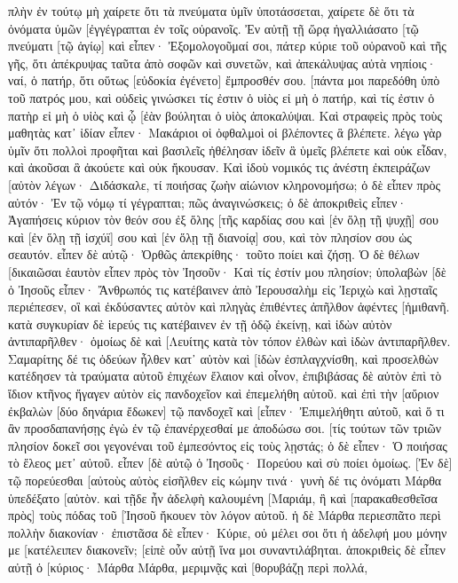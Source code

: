 πλὴν ἐν τούτῳ μὴ χαίρετε ὅτι τὰ πνεύματα ὑμῖν ὑποτάσσεται, χαίρετε δὲ ὅτι τὰ ὀνόματα ὑμῶν [ἐγγέγραπται ἐν τοῖς οὐρανοῖς. 
Ἐν αὐτῇ τῇ ὥρᾳ ἠγαλλιάσατο [τῷ πνεύματι [τῷ ἁγίῳ] καὶ εἶπεν· Ἐξομολογοῦμαί σοι, πάτερ κύριε τοῦ οὐρανοῦ καὶ τῆς γῆς, ὅτι ἀπέκρυψας ταῦτα ἀπὸ σοφῶν καὶ συνετῶν, καὶ ἀπεκάλυψας αὐτὰ νηπίοις· ναί, ὁ πατήρ, ὅτι οὕτως [εὐδοκία ἐγένετο] ἔμπροσθέν σου. 
[πάντα μοι παρεδόθη ὑπὸ τοῦ πατρός μου, καὶ οὐδεὶς γινώσκει τίς ἐστιν ὁ υἱὸς εἰ μὴ ὁ πατήρ, καὶ τίς ἐστιν ὁ πατὴρ εἰ μὴ ὁ υἱὸς καὶ ᾧ [ἐὰν βούληται ὁ υἱὸς ἀποκαλύψαι. 
Καὶ στραφεὶς πρὸς τοὺς μαθητὰς κατ᾽ ἰδίαν εἶπεν· Μακάριοι οἱ ὀφθαλμοὶ οἱ βλέποντες ἃ βλέπετε. 
λέγω γὰρ ὑμῖν ὅτι πολλοὶ προφῆται καὶ βασιλεῖς ἠθέλησαν ἰδεῖν ἃ ὑμεῖς βλέπετε καὶ οὐκ εἶδαν, καὶ ἀκοῦσαι ἃ ἀκούετε καὶ οὐκ ἤκουσαν. 
Καὶ ἰδοὺ νομικός τις ἀνέστη ἐκπειράζων [αὐτὸν λέγων· Διδάσκαλε, τί ποιήσας ζωὴν αἰώνιον κληρονομήσω; 
ὁ δὲ εἶπεν πρὸς αὐτόν· Ἐν τῷ νόμῳ τί γέγραπται; πῶς ἀναγινώσκεις; 
ὁ δὲ ἀποκριθεὶς εἶπεν· Ἀγαπήσεις κύριον τὸν θεόν σου ἐξ ὅλης [τῆς καρδίας σου καὶ [ἐν ὅλῃ τῇ ψυχῇ] σου καὶ [ἐν ὅλῃ τῇ ἰσχύϊ] σου καὶ [ἐν ὅλῃ τῇ διανοίᾳ] σου, καὶ τὸν πλησίον σου ὡς σεαυτόν. 
εἶπεν δὲ αὐτῷ· Ὀρθῶς ἀπεκρίθης· τοῦτο ποίει καὶ ζήσῃ. 
Ὁ δὲ θέλων [δικαιῶσαι ἑαυτὸν εἶπεν πρὸς τὸν Ἰησοῦν· Καὶ τίς ἐστίν μου πλησίον; 
ὑπολαβὼν [δὲ ὁ Ἰησοῦς εἶπεν· Ἄνθρωπός τις κατέβαινεν ἀπὸ Ἰερουσαλὴμ εἰς Ἰεριχὼ καὶ λῃσταῖς περιέπεσεν, οἳ καὶ ἐκδύσαντες αὐτὸν καὶ πληγὰς ἐπιθέντες ἀπῆλθον ἀφέντες [ἡμιθανῆ. 
κατὰ συγκυρίαν δὲ ἱερεύς τις κατέβαινεν ἐν τῇ ὁδῷ ἐκείνῃ, καὶ ἰδὼν αὐτὸν ἀντιπαρῆλθεν· 
ὁμοίως δὲ καὶ [Λευίτης κατὰ τὸν τόπον ἐλθὼν καὶ ἰδὼν ἀντιπαρῆλθεν. 
Σαμαρίτης δέ τις ὁδεύων ἦλθεν κατ᾽ αὐτὸν καὶ [ἰδὼν ἐσπλαγχνίσθη, 
καὶ προσελθὼν κατέδησεν τὰ τραύματα αὐτοῦ ἐπιχέων ἔλαιον καὶ οἶνον, ἐπιβιβάσας δὲ αὐτὸν ἐπὶ τὸ ἴδιον κτῆνος ἤγαγεν αὐτὸν εἰς πανδοχεῖον καὶ ἐπεμελήθη αὐτοῦ. 
καὶ ἐπὶ τὴν [αὔριον ἐκβαλὼν [δύο δηνάρια ἔδωκεν] τῷ πανδοχεῖ καὶ [εἶπεν· Ἐπιμελήθητι αὐτοῦ, καὶ ὅ τι ἂν προσδαπανήσῃς ἐγὼ ἐν τῷ ἐπανέρχεσθαί με ἀποδώσω σοι. 
[τίς τούτων τῶν τριῶν πλησίον δοκεῖ σοι γεγονέναι τοῦ ἐμπεσόντος εἰς τοὺς λῃστάς; 
ὁ δὲ εἶπεν· Ὁ ποιήσας τὸ ἔλεος μετ᾽ αὐτοῦ. εἶπεν [δὲ αὐτῷ ὁ Ἰησοῦς· Πορεύου καὶ σὺ ποίει ὁμοίως. 
[Ἐν δὲ] τῷ πορεύεσθαι [αὐτοὺς αὐτὸς εἰσῆλθεν εἰς κώμην τινά· γυνὴ δέ τις ὀνόματι Μάρθα ὑπεδέξατο [αὐτὸν. 
καὶ τῇδε ἦν ἀδελφὴ καλουμένη [Μαριάμ, ἣ καὶ [παρακαθεσθεῖσα πρὸς] τοὺς πόδας τοῦ [Ἰησοῦ ἤκουεν τὸν λόγον αὐτοῦ. 
ἡ δὲ Μάρθα περιεσπᾶτο περὶ πολλὴν διακονίαν· ἐπιστᾶσα δὲ εἶπεν· Κύριε, οὐ μέλει σοι ὅτι ἡ ἀδελφή μου μόνην με [κατέλειπεν διακονεῖν; [εἰπὲ οὖν αὐτῇ ἵνα μοι συναντιλάβηται. 
ἀποκριθεὶς δὲ εἶπεν αὐτῇ ὁ [κύριος· Μάρθα Μάρθα, μεριμνᾷς καὶ [θορυβάζῃ περὶ πολλά, 
